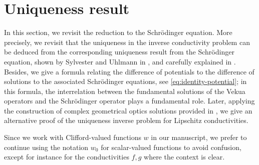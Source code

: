 \documentclass[12pt]{article}
\begin{document}
\section{Uniqueness result}\label{sec:uniqueness}
In this section, we revisit the reduction to the Schr\"{o}dinger equation. More precisely, we revisit that the uniqueness in the inverse conductivity problem can be deduced from the corresponding uniqueness result from the Schr\"{o}dinger equation, shown by Sylvester and Uhlmann in \cite{Sylvester-Uhlmann}, and carefully explained in \cite[Sec.\ 3.1]{Salo-2008}. Besides, we give a formula relating the difference of potentials to the difference of solutions to the associated Schr\"{o}dinger equations, see \eqref{eq:identity-potential}; in this formula, the interrelation between the fundamental solutions of the Vekua operators and the Schr\"{o}dinger operator plays a fundamental role. Later, applying the construction of complex geometrical optics solutions provided in \cite{Paivarinta2003}, we give an alternative proof of the uniqueness inverse problem for Lipschitz conductivities.

Since we work with Clifford-valued functions $w$ in our manuscript, we prefer to continue using the notation $w_0$ for scalar-valued functions to avoid confusion, except for instance for the conductivities $f, g$ where the context is clear.
\end{document}
